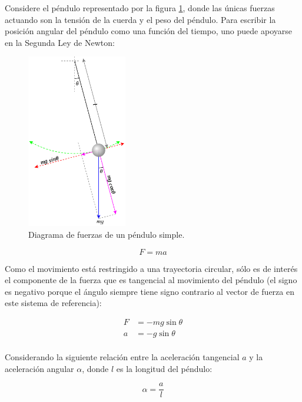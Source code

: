 \begin{ex}

    Considere el péndulo representado por la figura \ref{fig:pendulo}, donde
    las únicas fuerzas actuando son la tensión de la cuerda y el peso del
    péndulo. Para escribir la posición angular del péndulo como una función del
    tiempo, uno puede apoyarse en la Segunda Ley de Newton:

    \begin{figure}[H]
        \centering
        \includegraphics[height=3in]{img/pendulo.png}
        \caption{Diagrama de fuerzas de un péndulo simple.}
        \label{fig:pendulo}
    \end{figure}

    \begin{equation}
        F = ma
    \end{equation}

    Como el movimiento está restringido a una trayectoria circular, sólo es de
    interés el componente de la fuerza que es tangencial al movimiento del
    péndulo (el signo es negativo porque el ángulo siempre tiene signo
    contrario al vector de fuerza en este sistema de referencia):

    \begin{align}
        F &= -mg \sin \theta\\
        a &= -g \sin \theta\\
    \end{align}

    Considerando la siguiente relación entre la aceleración tangencial $a$ y la aceleración angular $\alpha$, donde $l$ es la longitud del péndulo:

    \begin{equation}
        \alpha = \frac{a}{l}
    \end{equation}


\end{ex}
